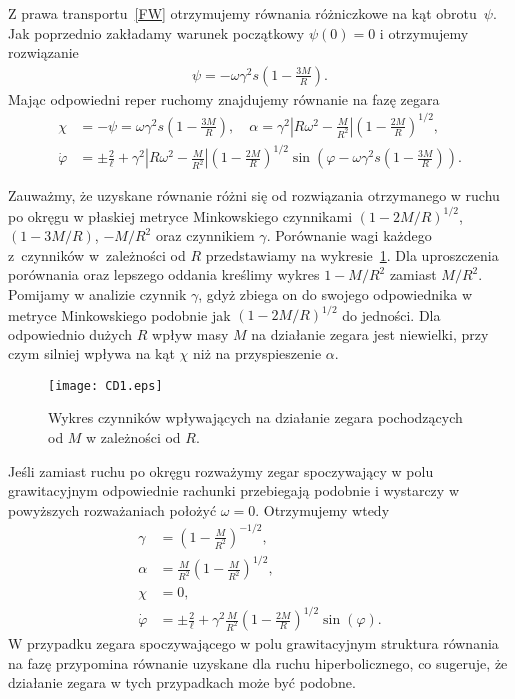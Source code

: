 Z prawa transportu~\eqref{FW} otrzymujemy równania różniczkowe 
na kąt obrotu~$\psi$. Jak poprzednio zakładamy warunek 
początkowy $\psi(0)=0$ i otrzymujemy rozwiązanie
\begin{align*}
\psi = - \omega \gamma^2 s \left( 1-\frac{3M}{R} \right).
\end{align*}
Mając odpowiedni reper ruchomy znajdujemy równanie na 
fazę zegara
\begin{align}\nonumber
\chi &= - \psi =\omega \gamma^2 s \left( 1-\frac{3M}{R} \right)
 , \quad 
\alpha =  \gamma^2 
\left| R\omega^2 - \frac{M}{R^2} \right|
\left( 1-\frac{2M}{R} \right)^{1/2} ,
\\ \nonumber
\dot{\varphi} &= \pm \frac{2}{\ell} + 
\gamma^2 
\left| R\omega^2 - \frac{M}{R^2} \right|
\left( 1-\frac{2M}{R} \right)^{1/2}
\sin \left(\varphi - 
\omega \gamma^2 s \left( 1-\frac{3M}{R} \right)
 \right) .
\end{align}


Zauważmy, że uzyskane równanie różni się od rozwiązania 
otrzymanego w ruchu po okręgu w 
płaskiej metryce Minkowskiego czynnikami
$\left( 1-2M/R \right)^{1/2}$,
$ \left( 1-3M/R \right)$, $-M/R^2$ oraz czynnikiem  $\gamma$. 
Porównanie wagi każdego z~czynników
w~zależności od $R$ 
przedstawiamy na wykresie~\ref{CD1plot}.
Dla uproszczenia porównania oraz lepszego oddania kreślimy 
wykres $1-M/R^2$ zamiast $M/R^2$. Pomijamy w analizie 
czynnik $\gamma$,
 gdyż zbiega on do swojego odpowiednika w metryce Minkowskiego
podobnie jak $\left( 1-2M/R \right)^{1/2}$ do jedności.
Dla odpowiednio dużych $R$ wpływ masy $M$ na działanie zegara jest niewielki, 
przy czym silniej wpływa na kąt $\chi$ niż na przyspieszenie $\alpha$.  
\begin{figure}[h]
\centering
\texttt{[image: CD1.eps]}
\caption{Wykres czynników wpływających na działanie zegara 
pochodzących od $M$ w zależności od $R$.}{\label{CD1plot}}
\end{figure}
\newpage
Jeśli zamiast ruchu po okręgu rozważymy zegar spoczywający w 
polu grawitacyjnym odpowiednie rachunki przebiegają podobnie i 
wystarczy w powyższych rozważaniach położyć $\omega=0$.
Otrzymujemy wtedy 
\begin{align*}
\gamma &= \left( 1 - \frac{M}{R^2} \right)^{-1/2},\\
\alpha &= \frac{M}{R^2} \left( 1 - \frac{M}{R^2} \right)^{1/2},\\
\chi &= 0,\\
\dot{\varphi} &= \pm \frac{2}{\ell} +
\gamma^2  \frac{M}{R^2} 
\left( 1-\frac{2M}{R} \right)^{1/2}
\sin \left(\varphi  \right).
\end{align*}
W przypadku zegara spoczywającego w polu grawitacyjnym 
struktura równania na fazę przypomina równanie uzyskane 
dla ruchu hiperbolicznego, co sugeruje, że działanie 
zegara w tych przypadkach może być podobne.  
